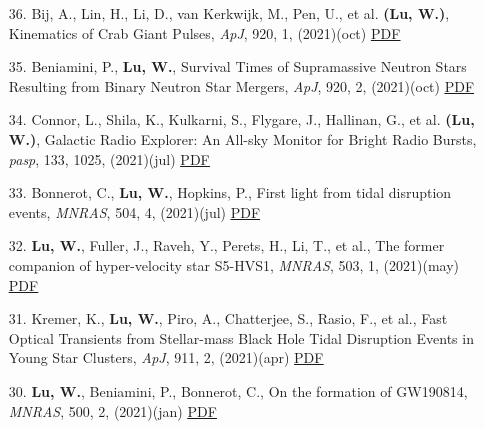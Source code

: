 \begin{itemize}[leftmargin=0.65cm]
\vspace{-0.1cm}
\item[36.]{Bij, A., Lin, H., Li, D., van Kerkwijk, M., Pen, U., et al. {\bf (Lu, W.)}, {Kinematics of Crab Giant Pulses}, {\it ApJ}, 920, 1, (2021)(oct) \href{https://ui.adsabs.harvard.edu/abs/2021ApJ...920...38B}{\underline{PDF}}}

\vspace{-0.1cm}
\item[35.]{Beniamini, P., {\bf Lu, W.}, {Survival Times of Supramassive Neutron Stars Resulting from Binary Neutron Star Mergers}, {\it ApJ}, 920, 2, (2021)(oct) \href{https://ui.adsabs.harvard.edu/abs/2021ApJ...920..109B}{\underline{PDF}}}

\vspace{-0.1cm}
\item[34.]{Connor, L., Shila, K., Kulkarni, S., Flygare, J., Hallinan, G., et al. {\bf (Lu, W.)}, {Galactic Radio Explorer: An All-sky Monitor for Bright Radio Bursts}, {\it pasp}, 133, 1025, (2021)(jul) \href{https://ui.adsabs.harvard.edu/abs/2021PASP..133g5001C}{\underline{PDF}}}

\vspace{-0.1cm}
\item[33.]{Bonnerot, C., {\bf Lu, W.}, Hopkins, P., {First light from tidal disruption events}, {\it MNRAS}, 504, 4, (2021)(jul) \href{https://ui.adsabs.harvard.edu/abs/2021MNRAS.504.4885B}{\underline{PDF}}}

\vspace{-0.1cm}
\item[32.]{{\bf Lu, W.}, Fuller, J., Raveh, Y., Perets, H., Li, T., et al., {The former companion of hyper-velocity star S5-HVS1}, {\it MNRAS}, 503, 1, (2021)(may) \href{https://ui.adsabs.harvard.edu/abs/2021MNRAS.503..603L}{\underline{PDF}}}

\vspace{-0.1cm}
\item[31.]{Kremer, K., {\bf Lu, W.}, Piro, A., Chatterjee, S., Rasio, F., et al., {Fast Optical Transients from Stellar-mass Black Hole Tidal Disruption Events in Young Star Clusters}, {\it ApJ}, 911, 2, (2021)(apr) \href{https://ui.adsabs.harvard.edu/abs/2021ApJ...911..104K}{\underline{PDF}}}

\vspace{-0.1cm}
\item[30.]{{\bf Lu, W.}, Beniamini, P., Bonnerot, C., {On the formation of GW190814}, {\it MNRAS}, 500, 2, (2021)(jan) \href{https://ui.adsabs.harvard.edu/abs/2021MNRAS.500.1817L}{\underline{PDF}}}


\end{itemize}

